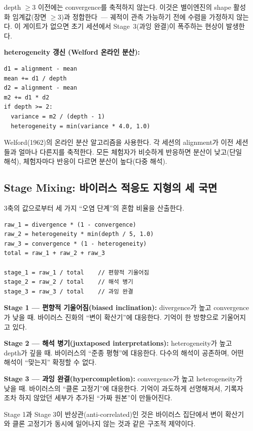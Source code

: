 \documentclass[11pt, a4paper]{article}
\begin{document}
depth $\geq 3$ 이전에는 convergence를 축적하지 않는다. 이것은 별이엔진의 shape 활성화 임계값(장면 $\geq 3$)과 정합한다~--- 궤적이 관측 가능하기 전에 수렴을 가정하지 않는다. 이 게이트가 없으면 초기 세션에서 Stage~3(과잉 완결)이 폭주하는 현상이 발생한다.

\textbf{heterogeneity 갱신 (Welford 온라인 분산):}
\begin{lstlisting}
d1 = alignment - mean
mean += d1 / depth
d2 = alignment - mean
m2 += d1 * d2
if depth >= 2:
  variance = m2 / (depth - 1)
  heterogeneity = min(variance * 4.0, 1.0)
\end{lstlisting}

Welford(1962)의 온라인 분산 알고리즘\cite{welford1962}을 사용한다. 각 세션의 alignment가 이전 세션들과 얼마나 다른지를 축적한다. 모든 체험자가 비슷하게 반응하면 분산이 낮고(단일 해석), 체험자마다 반응이 다르면 분산이 높다(다중 해석).

\subsection{Stage Mixing: 바이러스 적응도 지형의 세 국면}

3축의 값으로부터 세 가지 ``오염 단계''의 혼합 비율을 산출한다.

\begin{lstlisting}
raw_1 = divergence * (1 - convergence)
raw_2 = heterogeneity * min(depth / 5, 1.0)
raw_3 = convergence * (1 - heterogeneity)
total = raw_1 + raw_2 + raw_3

stage_1 = raw_1 / total    // 편향적 기울어짐
stage_2 = raw_2 / total    // 해석 병기
stage_3 = raw_3 / total    // 과잉 완결
\end{lstlisting}

\textbf{Stage 1 --- 편향적 기울어짐(biased inclination):} divergence가 높고 convergence가 낮을 때. 바이러스 진화의 ``변이 확산기''에 대응한다. 기억이 한 방향으로 기울어지고 있다.

\textbf{Stage 2 --- 해석 병기(juxtaposed interpretations):} heterogeneity가 높고 depth가 깊을 때. 바이러스의 ``준종 평형''에 대응한다. 다수의 해석이 공존하며, 어떤 해석이 ``맞는지'' 확정할 수 없다.

\textbf{Stage 3 --- 과잉 완결(hypercompletion):} convergence가 높고 heterogeneity가 낮을 때. 바이러스의 ``클론 고정기''에 대응한다. 기억이 과도하게 선명해져서, 기록자조차 하지 않았던 세부가 추가된 ``가짜 원본''이 만들어진다.

Stage 1과 Stage 3이 반상관(anti-correlated)인 것은 바이러스 집단에서 변이 확산기와 클론 고정기가 동시에 일어나지 않는 것과 같은 구조적 제약이다.
\end{document}
